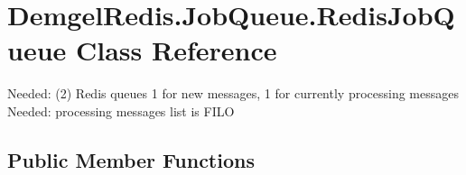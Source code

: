 \hypertarget{class_demgel_redis_1_1_job_queue_1_1_redis_job_queue}{}\section{Demgel\+Redis.\+Job\+Queue.\+Redis\+Job\+Queue Class Reference}
\label{class_demgel_redis_1_1_job_queue_1_1_redis_job_queue}


Needed\+: (2) Redis queues 1 for new messages, 1 for currently processing messages Needed\+: processing messages list is F\+I\+L\+O  


\subsection*{Public Member Functions}
